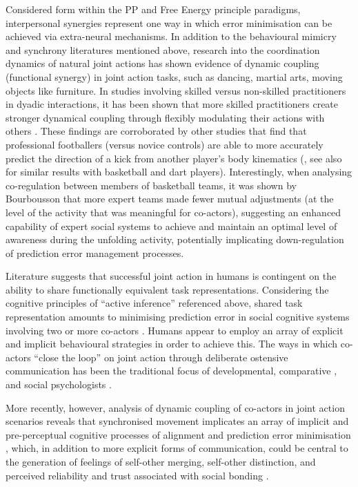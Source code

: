 \begin{CJK}{UTF8}{gbsn}
{Considered form within the PP and Free Energy principle paradigms, interpersonal synergies represent one way in which error minimisation can be achieved via extra-neural mechanisms.  In addition to the behavioural mimicry and synchrony literatures mentioned above, research into the coordination dynamics of natural joint actions has shown evidence of dynamic coupling (functional synergy) in joint action tasks, such as dancing, martial arts, moving objects like furniture.  In studies involving skilled versus non-skilled practitioners in dyadic interactions, it has been shown that more skilled practitioners create stronger dynamical coupling through flexibly modulating their actions with others \citep{Schmidt2011, Caron2017}. These findings are corroborated by other studies that find that professional footballers (versus novice controls) are able to more accurately predict the direction of a kick from another player's body kinematics (\cite{Tomeo2012}, see also \cite{Aglioti2008,Mulligan2016} for similar results with basketball and dart players). Interestingly, when analysing co-regulation between members of basketball teams, it was shown by Bourbousson \textcite{Bourbousson2015} that more expert teams made fewer mutual adjustments (at the level of the activity that was meaningful for co-actors), suggesting an enhanced capability of expert social systems to achieve and maintain an optimal level of awareness during the unfolding activity, potentially implicating down-regulation of prediction error management processes.










Literature suggests that successful joint action in humans is contingent on the ability to share functionally equivalent task representations. Considering the cognitive principles of ``active inference'' referenced above, shared task representation amounts to minimising prediction error in social cognitive systems involving two or more co-actors \citep{Semin2008,Frith2010}.  Humans appear to employ an array of explicit and implicit behavioural strategies in order to achieve this.  The ways in which co-actors ``close the loop'' \citep{Frith2007} on joint action through deliberate ostensive communication has been the traditional focus of developmental, comparative \cite{Tomasello2005a}, and social psychologists \citep{Sebanz2006}.

More recently, however, analysis of dynamic coupling of co-actors in joint action scenarios reveals that synchronised movement implicates an array of implicit and pre-perceptual cognitive processes of alignment and prediction error minimisation \citep{Schmidt2011}, which, in addition to more explicit forms of communication, could be central to the generation of feelings of self-other merging, self-other distinction, and perceived reliability and trust associated with social bonding \citep{Marsh2009}.


}
\end{CJK}
